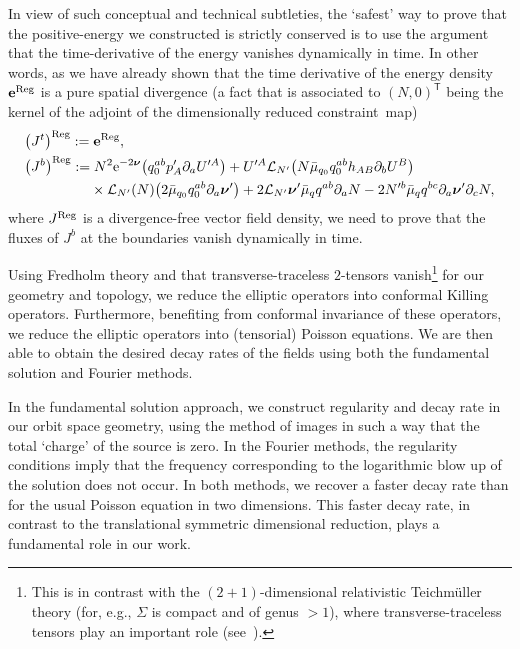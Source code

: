 \documentclass[pdftex]{sigma}
\def\ptl{\partial}%
\def\mbo#1{\boldsymbol{#1}}%
\numberwithin{equation}{section}
\begin{document}
In view of such conceptual and technical subtleties, the `safest' way to prove that the positive-energy  we constructed is strictly conserved is to use the argument that the time-derivative of the energy  vanishes dynamically in time. In other words, as we have already shown that the time derivative of the energy density $\mathbf{e}^{{\rm Reg}}$ is a pure spatial divergence (a fact that is associated to $(N, 0)^{\mathsf{T}}$ being the kernel of the adjoint of the dimensionally reduced constraint~map)
\begin{align*}
&\bigl(J^ t\bigr)^ {{\rm Reg}}:= \mathbf{e}^{{\rm Reg}}, \notag\\
&\bigl(J^b\bigr)^{{\rm Reg}}:= N^2 {\rm e}^{-2 \mbo{\nu}}\bigl(q_{0}^{ab} p'_A \ptl_a U'^A\bigr) + U'^A \mathcal{L}_{N'} \bigl(N\bar{\mu}_{q_0} q^{ab}_0 h_{AB} \ptl_b U^B\bigr) \notag\\
&\hphantom{\bigl(J^b\bigr)^{{\rm Reg}}:=}{}\times \mathcal{L}_{N'} (N) \bigl(2 \bar{\mu}_{q_0} q_{0}^{ab} \ptl_a \mbo{\nu}'\bigr) + 2 \mathcal{L}_{N'} \mbo{\nu}' \bar{\mu}_q q^{ab} \ptl_a N - 2 N'^b \bar{\mu}_q q^{bc} \ptl_a \mbo{\nu}' \ptl_c N,
\end{align*}
where $J^{{\rm Reg}}$ is a divergence-free vector field density, we need to prove that the fluxes of $J^b$ at the boundaries vanish dynamically in time.

Using Fredholm theory and that transverse-traceless $2$-tensors
vanish\footnote{This is in contrast with the $(2+1)$-dimensional relativistic Teichm\"uller theory (for, e.g., $\Sigma$ is compact and of genus $>1$), where transverse-traceless tensors play an important role (see~\cite{Moncrief_2007}).} for our geometry and topology, we reduce the elliptic operators into conformal Killing operators. Furthermore, benefiting from conformal invariance of these operators, we reduce the elliptic operators into (tensorial) Poisson equations. We are then able to obtain the desired decay rates of the fields using both the fundamental solution and Fourier methods.

In the fundamental solution approach, we construct regularity and decay rate in our orbit space geometry, using the method of images in such a way that the total `charge' of the source is zero. In the Fourier methods, the regularity conditions imply that the frequency corresponding to the logarithmic blow up of the solution does not occur. In both methods, we recover a faster decay rate than for the usual Poisson equation in two dimensions. This faster decay rate, in contrast to the translational symmetric dimensional reduction, plays a fundamental role in our work.
\end{document}
